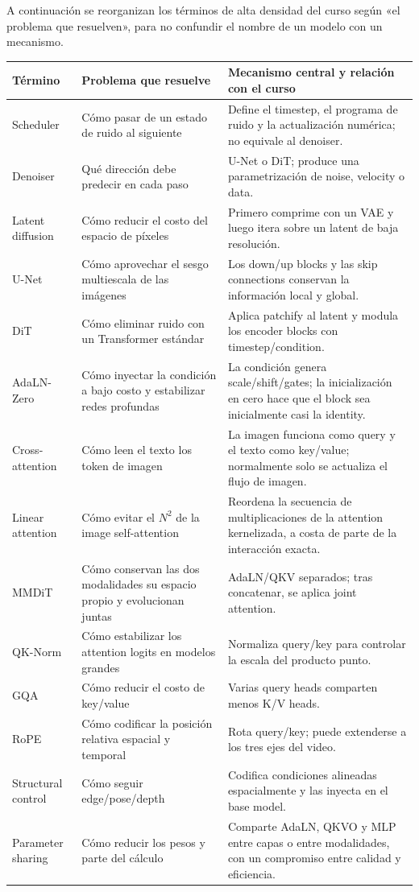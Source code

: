 A continuación se reorganizan los términos de alta densidad del curso según «el problema que resuelven», para no confundir el nombre de un modelo con un mecanismo.

\begin{center}
\small
\begin{tabularx}{\textwidth}{p{} X X}
\toprule
\textbf{Término} & \textbf{Problema que resuelve} & \textbf{Mecanismo central y relación con el curso} \\
\midrule
Scheduler & Cómo pasar de un estado de ruido al siguiente & Define el timestep, el programa de ruido y la actualización numérica; no equivale al denoiser. \\
Denoiser & Qué dirección debe predecir en cada paso & U-Net o DiT; produce una parametrización de noise, velocity o data. \\
Latent diffusion & Cómo reducir el costo del espacio de píxeles & Primero comprime con un VAE y luego itera sobre un latent de baja resolución. \\
U-Net & Cómo aprovechar el sesgo multiescala de las imágenes & Los down/up blocks y las skip connections conservan la información local y global. \\
DiT & Cómo eliminar ruido con un Transformer estándar & Aplica patchify al latent y modula los encoder blocks con timestep/condition. \\
AdaLN-Zero & Cómo inyectar la condición a bajo costo y estabilizar redes profundas & La condición genera scale/shift/gates; la inicialización en cero hace que el block sea inicialmente casi la identity. \\
Cross-attention & Cómo leen el texto los token de imagen & La imagen funciona como query y el texto como key/value; normalmente solo se actualiza el flujo de imagen. \\
Linear attention & Cómo evitar el $N^2$ de la image self-attention & Reordena la secuencia de multiplicaciones de la attention kernelizada, a costa de parte de la interacción exacta. \\
MMDiT & Cómo conservan las dos modalidades su espacio propio y evolucionan juntas & AdaLN/QKV separados; tras concatenar, se aplica joint attention. \\
QK-Norm & Cómo estabilizar los attention logits en modelos grandes & Normaliza query/key para controlar la escala del producto punto. \\
GQA & Cómo reducir el costo de key/value & Varias query heads comparten menos K/V heads. \\
RoPE & Cómo codificar la posición relativa espacial y temporal & Rota query/key; puede extenderse a los tres ejes del video. \\
Structural control & Cómo seguir edge/pose/depth & Codifica condiciones alineadas espacialmente y las inyecta en el base model. \\
Parameter sharing & Cómo reducir los pesos y parte del cálculo & Comparte AdaLN, QKVO y MLP entre capas o entre modalidades, con un compromiso entre calidad y eficiencia. \\
\bottomrule
\end{tabularx}
\end{center}

